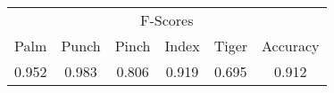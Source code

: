\documentclass{standalone}
\begin{document}
 
 \begin{tabular}{|c|c|c|c|c ||c|}
\cline{1-6}\multicolumn{6}{|c|}{F-Scores} \\ 
\cline{1-6}Palm & Punch & Pinch & Index & Tiger & Accuracy\\ 
\cline{1-6}0.952 & 0.983 & 0.806 & 0.919 & 0.695 & 0.912\\ 
 \cline{1-6}\hline \end{tabular}
 
\end{document}
